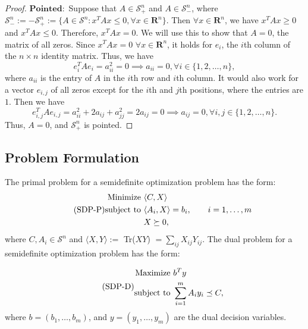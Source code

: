 \begin{proof}
		$\mathbf{Pointed: }$ Suppose that $A \in \mathcal{S}^n_+$ and $A \in \mathcal{S}^n_-$, where $\mathcal{S}^n_- := -\mathcal{S}^n_+ := \{A \in \mathcal{S}^n : x^T A x \leq 0, \forall x \in \mathbf{R}^n\}$.  Then $\forall x \in \mathbf{R}^n$, we have $x^T A x \geq 0$ and $x^T A x \leq 0$. Therefore, $x^T A x = 0$. We will use this to show that $A = 0$, the matrix of all zeros. Since $x^T A x = 0$ $\forall x \in \mathbf{R}^n$, it holds for $e_i$, the $i$th column of the $n \times n$ identity matrix. Thus, we have
		$$
		e_i^T A e_i = a_{ii}^2 = 0 \implies a_{ii} = 0,  \forall i \in \{1, 2, \dots, n\},
		$$
		where $a_{ii}$ is the entry of $A$ in the $i$th row and $i$th column. It would also work for a vector $e_{i,j}$ of all zeros except for the $i$th and $j$th positions, where the entries are $1$. Then we have
		$$
		e_{i,j}^T A e_{i,j} = a_{ii}^2 + 2 a_{ij} + a_{jj}^2 = 2 a_{ij} = 0 \implies a_{ij} = 0, \forall i,j \in \{1, 2, \dots, n\}.
		$$
		Thus, $A = 0$, and $\mathcal{S}_+^n$ is pointed.
	\end{proof}
	
	\subsection{Problem Formulation}
	
	The primal problem for a semidefinite optimization problem has the form:
	\begin{equation} \label{sdpprimal} \tag{SDP-P}
		\begin{split}
			\textnormal{Minimize } & \langle C,X \rangle \\
			\textnormal{subject to } & \langle A_i, X \rangle = b_i, \qquad  i = 1, \dots, m\\
			& X \succeq 0,
		\end{split}
	\end{equation}
	where $C, A_i \in \mathcal{S}^n$ and $\langle X, Y \rangle := $ Tr($X Y$) $= \sum_{ij} X_{ij} Y_{ij}$. The dual problem for a semidefinite optimization problem has the form:
	
	\begin{equation} \label{sdpdual} \tag{SDP-D}
		\begin{split}
			\textnormal{Maximize } & b^T y \\
			\textnormal{subject to } & \sum_{i=1}^{m} A_i y_i \preceq C,
		\end{split}
	\end{equation}
	where $b = (b_1 , \dots, b_m)$, and $y = (y_1, \dots, y_m)$ are the dual decision variables.
	
